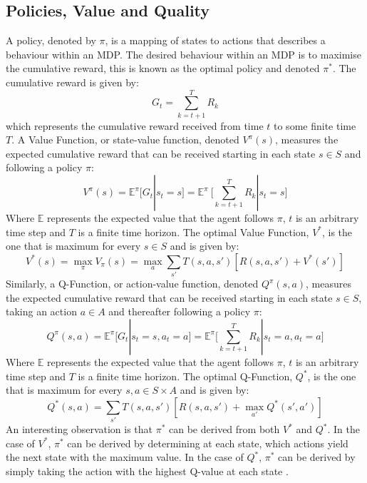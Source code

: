 \subsection{Policies, Value and Quality}
A policy, denoted by $\pi$, is a mapping of states to actions that describes a behaviour within an MDP. The desired behaviour within an MDP is to maximise the cumulative reward, this is known as the optimal policy and denoted $\pi^*$. The cumulative reward is given by:
\begin{equation}
\label{eqn:return}
G_t = \sum_{k=t+1}^TR_{k}
\end{equation}
which represents the cumulative reward received from time $t$ to some finite time $T$.
A Value Function, or state-value function, denoted $V^\pi(s)$, measures the expected cumulative reward that can be received starting in each state $s \in S$ and following a policy $\pi$:
\begin{equation}
\label{eqn:vs}
    V^\pi(s) = \mathbb{E}^\pi\Bigg[G_t | s_t = s\Bigg] = \mathbb{E}^\pi\ \Bigg[\sum_{k=t+1}^TR_{k} | s_t = s \Bigg]
\end{equation}
Where $\mathbb{E}$ represents the expected value that the agent follows $\pi$, $t$ is an arbitrary time step and $T$ is a finite time horizon.
The optimal Value Function, $V^*$, is the one that is maximum for every $s \in S$ and is given by:
\begin{equation}
\label{eqn:vsm}
    V^*(s) = \max_\pi V_\pi(s) = \max_a\sum_{s'}T(s,a,s')[R(s,a,s')+V^*(s')]
\end{equation}
Similarly, a Q-Function, or action-value function, denoted $Q^\pi(s,a)$, measures the expected cumulative reward that can be received starting in each state $s \in S$, taking an action $a \in A$ and thereafter following a policy $\pi$:
\begin{equation}
\label{eqn:qsa}
Q^\pi(s,a) = \mathbb{E}^\pi\Bigg[G_t | s_t = s,a_t = a\Bigg] = \mathbb{E}^\pi\Bigg[\sum_{k=t+1}^TR_{k}|s_t=a, a_t = a\Bigg]
\end{equation}
Where $\mathbb{E}$ represents the expected value that the agent follows $\pi$, $t$ is an arbitrary time step and $T$ is a finite time horizon.
The optimal Q-Function, $Q^*$, is the one that is maximum for every $s,a \in S \times A$ and is given by:
\begin{equation}
\label{eqn:qsn}
Q^*(s,a) = \sum_{s'}T(s,a,s')[R(s,a,s')+\max_{a'}Q^*(s',a')]
\end{equation}
An interesting observation is that $\pi^*$ can be derived from both $V^*$ and $Q^*$. In the case of $V^*$, $\pi^*$ can be derived by determining at each state, which actions yield the next state with the maximum value. In the case of $Q^*$, $\pi^*$ can be derived by simply taking the action with the highest Q-value at each state \cite{Sutton1998}.

